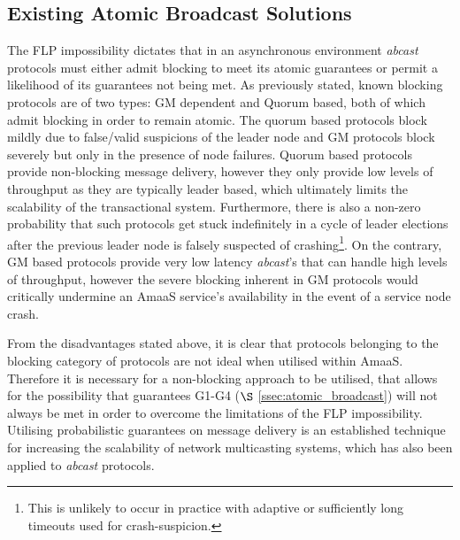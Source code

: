     \subsection{Existing Atomic Broadcast Solutions}
    The FLP impossibility \citep{Fischer:1985:IDC:3149.214121} dictates that in an asynchronous environment \emph{abcast} protocols must either admit blocking to meet its atomic guarantees or permit a likelihood of its guarantees not being met.  As  previously stated, known blocking protocols are of two types: GM dependent and Quorum based, both of which admit blocking in order to remain atomic.  The quorum based protocols block mildly due to false/valid suspicions of the leader node and GM protocols block severely but only in the presence of node failures.  Quorum based protocols provide non-blocking message delivery, however they only provide low levels of throughput as they are typically leader based, which ultimately limits the scalability of the transactional system.  Furthermore, there is also a non-zero probability that such protocols get stuck indefinitely in a cycle of leader elections after the previous leader node is falsely suspected of crashing\footnote{This is unlikely to occur in practice with adaptive or sufficiently long timeouts used for crash-suspicion.}.  On the contrary, GM based protocols provide very low latency \emph{abcast}'s that can handle high levels of throughput, however the severe blocking inherent in GM protocols would critically undermine an \textsf{AmaaS} service's availability in the event of a service node crash.  
    
    From the disadvantages stated above, it is clear that protocols belonging to the blocking category of protocols are not ideal when utilised within \textsf{AmaaS}.  Therefore it is necessary for a non-blocking approach to be utilised, that allows for the possibility that guarantees G1-G4 ($\S$ \ref{ssec:atomic_broadcast}) will not always be met in order to overcome the limitations of the FLP impossibility.  Utilising probabilistic guarantees on message delivery is an established technique for increasing the scalability of network multicasting systems\citep{Kermarrec:2003:PRD:766617.766623}, which has also been applied to \emph{abcast} protocols.  
    
